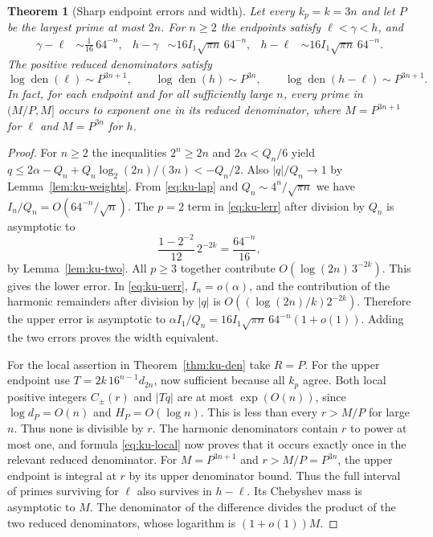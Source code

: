 \documentclass[11pt,a4paper]{article}
\newtheorem{theorem}{Theorem}[section]
\theoremstyle{definition}\newtheorem{definition}[theorem]{Definition}\newtheorem{example}[theorem]{Example}
\theoremstyle{remark}\newtheorem{remark}[theorem]{Remark}
\begin{document}
\begin{theorem}[Sharp endpoint errors and width]\label{thm:ku-sharp}
Let every $k_p=k=3n$ and let $P$ be the largest prime at most $2n$.
For $n\ge2$ the endpoints satisfy $\ell<\gamma<h$, and
\begin{align*}
 \gamma-\ell&\sim \frac1{16}\,64^{-n},&
 h-\gamma&\sim 16I_1\sqrt{\pi n}\,64^{-n},&
 h-\ell&\sim 16I_1\sqrt{\pi n}\,64^{-n}.
\end{align*}
The positive reduced denominators satisfy
\[
 \log\operatorname{den}(\ell)\sim P^{3n+1},\qquad
 \log\operatorname{den}(h)\sim P^{3n},\qquad
 \log\operatorname{den}(h-\ell)\sim P^{3n+1}.
\]
In fact, for each endpoint and for all sufficiently large $n$, every
prime in $(M/P,M]$ occurs to exponent one in its reduced denominator,
where $M=P^{3n+1}$ for $\ell$ and $M=P^{3n}$ for $h$.
\end{theorem}
\begin{proof}
For $n\ge2$ the inequalities $2^n\ge2n$ and
$2\alpha<Q_n/6$ yield
$q\le2\alpha-Q_n+Q_n\log_2(2n)/(3n)<-Q_n/2$.
Also $|q|/Q_n\to1$ by Lemma~\ref{lem:ku-weights}. From
\eqref{eq:ku-lap} and $Q_n\sim4^n/\sqrt{\pi n}$ we have
$I_n/Q_n=O(64^{-n}/\sqrt n)$. The $p=2$ term in
\eqref{eq:ku-lerr} after division by $Q_n$ is asymptotic to
\[
 \frac{1-2^{-2}}{12}\,2^{-2k}=\frac{64^{-n}}{16},
\]
by Lemma~\ref{lem:ku-two}. All $p\ge3$ together contribute
$O(\log(2n)\,3^{-2k})$. This gives the lower error. In
\eqref{eq:ku-uerr}, $I_n=o(\alpha)$, and the contribution of the
harmonic remainders after division by $|q|$ is
$O((\log(2n)/k)2^{-2k})$. Therefore the upper error is asymptotic to
$\alpha I_1/Q_n=16I_1\sqrt{\pi n}\,64^{-n}(1+o(1))$.
Adding the two errors proves the width equivalent.

For the local assertion in Theorem~\ref{thm:ku-den} take $R=P$.
For the upper endpoint use $T=2k\,16^{n-1}d_{2n}$, now sufficient
because all $k_p$ agree. Both local positive integers $C_\pm(r)$ and
$|Tq|$ are at most $\exp(O(n))$, since $\log d_P=O(n)$ and
$H_P=O(\log n)$. This is less than every $r>M/P$ for large $n$.
Thus none is divisible by $r$. The harmonic denominators contain $r$
to power at most one, and formula \eqref{eq:ku-local} now proves that
it occurs exactly once in the relevant reduced denominator.
For $M=P^{3n+1}$ and $r>M/P=P^{3n}$, the upper endpoint is integral
at $r$ by its upper denominator bound. Thus the full interval of primes
surviving for $\ell$ also survives in $h-\ell$. Its Chebyshev mass
is asymptotic to $M$. The denominator of the difference divides the
product of the two reduced denominators, whose logarithm is $(1+o(1))M$.
\end{proof}
\end{document}
